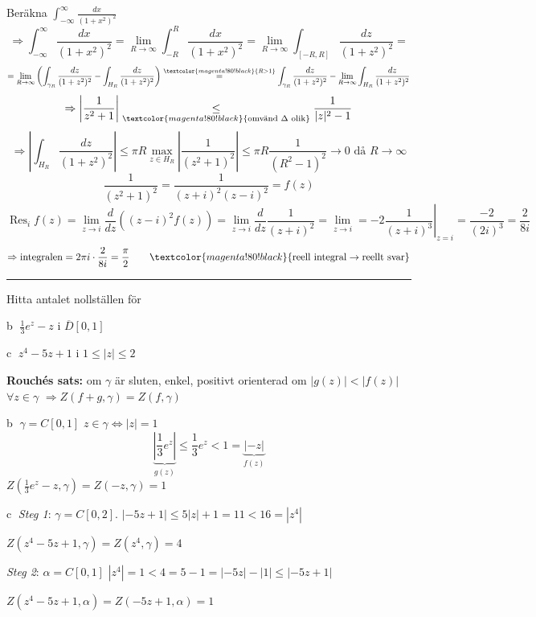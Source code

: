  \quad Beräkna $\displaystyle\int_{-\infty}^\infty \frac{dx}{(1 + x^2)^2}$
\[ \Rightarrow \int_{-\infty}^\infty \frac{dx}{(1 + x^2)^2} = \lim_{R \to \infty} \int_{-R}^R \frac{dx}{(1 + x^2)^2} = \lim_{R \to \infty} \int_{[-R, R]} \frac{dz}{(1 + z^2)^2} = \]
\[ = \lim_{R \to \infty}\left( \int_{\gamma_R} \frac{dz}{(1 + z^2)^2} - \int_{H_R} \frac{dz}{(1 + z^2)^2} \right) \overset{\textcolor{magenta!80!black}{R > 1}}{=} \int_{\gamma_R} \frac{dz}{(1 + z^2)^2} - \lim_{R \to \infty} \int_{H_R} \frac{dz}{(1 + z^2)^2} \]
\[ \Rightarrow \left| \frac{1}{z^2 + 1} \right| \underset{\textcolor{magenta!80!black}{\text{omvänd } \Delta \text{ olik}}}{\le} \frac{1}{|z|^2 - 1} \]
\[ \Rightarrow \left| \int_{H_R} \frac{dz}{(1 + z^2)^2} \right| \le \pi R \max_{z \in H_R} \left| \frac{1}{(z^2 + 1)^2} \right| \le \pi R \frac{1}{(R^2 - 1)^2} \to 0 \text{ då } R \to \infty \]
\[ \frac{1}{(z^2 + 1)^2} = \frac{1}{(z + i)^2(z - i)^2} = f(z) \]
\[ \operatorname{Res}_i f(z) = \lim_{z \to i} \frac{d}{dz}\left( (z - i)^2 f(z) \right) = \lim_{z \to i} \frac{d}{dz} \frac{1}{(z + i)^2} = \lim_{z \to i} = -2 \left. \frac{1}{(z + i)^3} \right|_{z = i} = \frac{-2}{(2i)^3} = \frac{2}{8i} \]
\[ \Rightarrow \text{integralen} = 2\pi i \cdot \frac{2}{8i} = \frac{\pi}{2} \qquad \textcolor{magenta!80!black}{\text{reell integral} \to \text{reellt svar}} \]

\noindent\rule{\linewidth}{0.4pt}

\begin{minipage}[t]{0.55\linewidth}
 \quad Hitta antalet nollställen för

\textcircled{b} $\frac{1}{3}e^z - z$ \quad i $\overline{D}[0, 1]$

\textcircled{c} $z^4 - 5z + 1$ \quad i $1 \le |z| \le 2$
\end{minipage}\hfill
\begin{minipage}[t]{0.42\linewidth}
\textbf{Rouchés sats:} om $\gamma$ är sluten, enkel, positivt orienterad om $|g(z)| < |f(z)|$ $\forall z \in \gamma$ $\Rightarrow Z(f + g, \gamma) = Z(f, \gamma)$
\end{minipage}

\textcircled{b} $\gamma = C[0, 1]$ \quad $z \in \gamma \Leftrightarrow |z| = 1$
\[ \underbrace{\left| \frac{1}{3}e^z \right|}_{g(z)} \le \frac{1}{3}e^z < 1 = \underbrace{|-z|}_{f(z)} \]
$Z(\frac{1}{3}e^z - z, \gamma) = Z(-z, \gamma) = 1$

\textcircled{c} \emph{Steg 1}: $\gamma = C[0, 2]$. $|-5z + 1| \le 5|z| + 1 = 11 < 16 = |z^4|$

$Z(z^4 - 5z + 1, \gamma) = Z(z^4, \gamma) = 4$

\emph{Steg 2}: $\alpha = C[0, 1]$ \quad $|z^4| = 1 < 4 = 5 - 1 = |-5z| - |1| \le |-5z + 1|$

$Z(z^4 - 5z + 1, \alpha) = Z(-5z + 1, \alpha) = 1$
